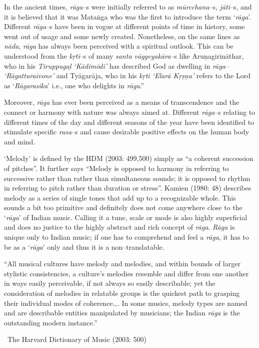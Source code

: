 In the ancient times, \textit{rāga}–s were initially referred to as \textit{mūrcchana}–s, \textit{jāti}–s, and it is believed that it was Mataṅga who was the first to introduce the term ‘\textit{rāga}’. Different \textit{rāga}–s have been in vogue at different points of time in history, some went out of usage and some newly created. Nonetheless, on the same lines as \textit{nāda}, \textit{rāga} has always been perceived with a spiritual outlook. This can be understood from the \textit{kṛti}–s of many \textit{santa vāggeyakāra}–s like Aruṇagirināthar, who in his \textit{Tiruppugaḻ ‘Kādimōdi’} has described God as dwelling in \textit{rāga– ‘Rāgatturaivone’} and Tyāgarāja, who in his \textit{kṛti ‘Elarā Kṛṣṇa’} refers to the Lord as ‘\textit{Rāgarasika}’ i.e., one who delights in \textit{rāga}.”

Moreover, \textit{rāga} has ever been perceived as a means of transcendence and the connect or harmony with nature was always aimed at. Different \textit{rāga}–s relating to different times of the day and different seasons of the year have been identified to stimulate specific \textit{rasa}–s and cause desirable positive effects on the human body and mind.\supskpt{\ref{999–aside.xhtmlid–c2–en7}}

‘Melody’ is defined by the HDM (2003: 499,500) simply as “a coherent succession of pitches”. It further says “Melody is opposed to harmony in referring to successive rather than rather than simultaneous sounds; it is opposed to rhythm in referring to pitch rather than duration or stress”. Kamien (1980: 48) describes melody as a series of single tones that add up to a recognizable whole. This sounds a bit too primitive and definitely does not come anywhere close to the ‘\textit{rāga}’ of Indian music. Calling it a tune, scale or mode is also highly superficial and does no justice to the highly abstract and rich concept of \textit{rāga}. \textit{Rāga} is unique only to Indian music; if one has to comprehend and feel a \textit{rāga}, it has to be as a ‘\textit{rāga}’ only and thus it is a non–translatable.

\begin{myquote}
“All musical cultures have melody and melodies, and within bounds of larger stylistic consistencies, a culture’s melodies resemble and differ from one another in ways easily perceivable, if not always so easily describable; yet the consideration of melodies in relatable groups is the quickest path to grasping their individual modes of coherence…. In some musics, melody types are named and are describable entities manipulated by musicians; the Indian \textit{rāga} is the outstanding modern instance.” 

~\hfill The Harvard Dictionary of Music (2003: 500)
\end{myquote}

